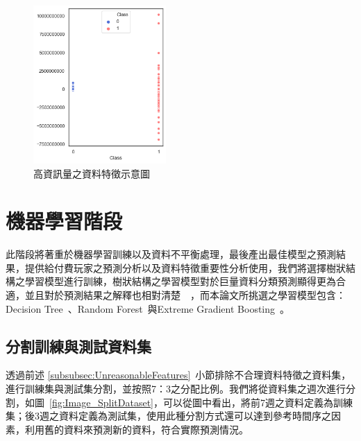 \begin{figure}[!htb]
  \begin{center}
    \includegraphics[width=0.45\textwidth]{figures/Image_ValuableFeatures.png}
    \caption[高資訊量之資料特徵示意圖]{高資訊量之資料特徵示意圖}
    \label{fig:Image_ValuableFeatures}
  \end{center}
\end{figure}

\section{機器學習階段}

此階段將著重於機器學習訓練以及資料不平衡處理，最後產出最佳模型之預測結果，提供給付費玩家之預測分析以及資料特徵重要性分析使用，我們將選擇樹狀結構之學習模型進行訓練，樹狀結構之學習模型對於巨量資料分類預測顯得更為合適，並且對於預測結果之解釋也相對清楚~\cite{lee2018game}~\cite{sifa2015predicting}，而本論文所挑選之學習模型包含：Decision Tree~\cite{breiman1984classification}、Random Forest~\cite{breiman2001random}與Extreme Gradient Boosting~\cite{chen2016xgboost}。
\newpage

\subsection{分割訓練與測試資料集}
\label{subsec:SplitDataset}

透過前述 \ref{subsubsec:UnreasonableFeatures}~小節排除不合理資料特徵之資料集，進行訓練集與測試集分割，並按照7：3之分配比例。我們將從資料集之週次進行分割，如圖~\ref{fig:Image_SplitDataset}，可以從圖中看出，將前7週之資料定義為訓練集；後3週之資料定義為測試集，使用此種分割方式還可以達到參考時間序之因素，利用舊的資料來預測新的資料，符合實際預測情況。


